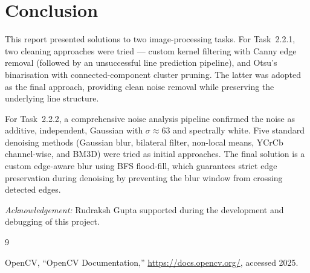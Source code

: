 \documentclass[conference, twocolumn]{IEEEtran}
\begin{document}
\section*{Conclusion}

This report presented solutions to two image-processing tasks. For Task~2.2.1, two cleaning approaches were tried --- custom kernel filtering with Canny edge removal (followed by an unsuccessful line prediction pipeline), and Otsu's binarisation with connected-component cluster pruning. The latter was adopted as the final approach, providing clean noise removal while preserving the underlying line structure.

For Task~2.2.2, a comprehensive noise analysis pipeline confirmed the noise as additive, independent, Gaussian with $\sigma \approx 63$ and spectrally white. Five standard denoising methods (Gaussian blur, bilateral filter, non-local means, YCrCb channel-wise, and BM3D) were tried as initial approaches. The final solution is a custom edge-aware blur using BFS flood-fill, which guarantees strict edge preservation during denoising by preventing the blur window from crossing detected edges.

\textit{Acknowledgement:} Rudraksh Gupta supported during the development and debugging of this project.

\begin{thebibliography}{9}

OpenCV, ``OpenCV Documentation,'' \url{https://docs.opencv.org/}, accessed 2025.

\end{thebibliography}
\end{document}
